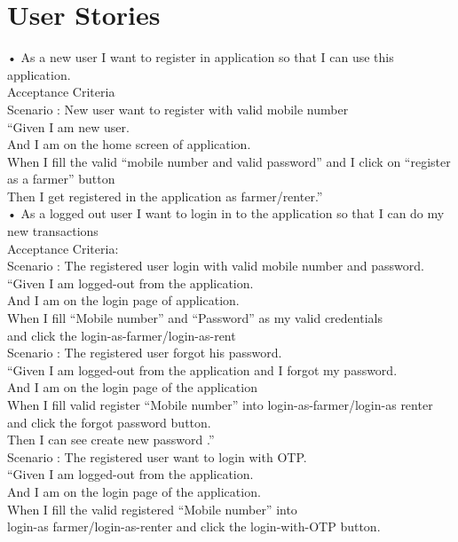 \documentclass[conference]{IEEEtran}
\begin{document}
\section{User Stories}
• As a new user I want to register in application so that I can use this application.\\
Acceptance Criteria \\
Scenario : New user want to register with valid mobile number \\
“Given I am new user.\\
And I am on the home screen of application.\\
When I fill the valid “mobile number and valid password” and I click on “register\\
as a farmer” button \\
Then I get registered in the application as farmer/renter.”\\
• As a logged out user I want to login in to the application so that I can do my new transactions\\
 Acceptance Criteria:\\
 Scenario : The registered user login with valid mobile number and password.\\
“Given I am logged-out from the application.\\
And I am on the login page of application.\\
When I fill “Mobile number” and “Password” as my valid credentials\\
and click the login-as-farmer/login-as-rent\\
 Scenario : The registered user forgot his password.\\
“Given I am logged-out from the application and I forgot my password.\\
And I am on the login page of the application\\
When I fill valid register “Mobile number” into login-as-farmer/login-as renter and click the forgot password button.\\
Then I can see create new password .”\\
 Scenario : The registered user want to login with OTP.\\
“Given I am logged-out from the application.\\
And I am on the login page of the application.\\
When I fill the valid registered “Mobile number” into\\ login-as farmer/login-as-renter and click the login-with-OTP button.\\
\end{document}
